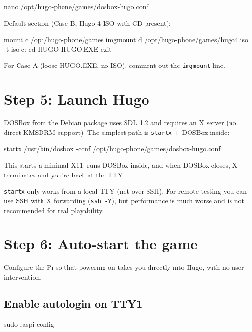 \begin{note}
\begin{shellcode}
nano /opt/hugo-phone/games/dosbox-hugo.conf
\end{shellcode}

Default section (Case B, Hugo 4 ISO with CD present):

\begin{plaincode}
[autoexec]
mount c /opt/hugo-phone/games
imgmount d /opt/hugo-phone/games/hugo4.iso -t iso
c:
cd HUGO
HUGO.EXE
exit
\end{plaincode}

For Case A (loose HUGO.EXE, no ISO), comment out the \texttt{imgmount} line.

\section{Step 5: Launch Hugo}

DOSBox from the Debian package uses SDL 1.2 and requires an X server (no direct KMSDRM support). The simplest path is \texttt{startx} + DOSBox inside:

\begin{shellcode}
startx /usr/bin/dosbox -conf /opt/hugo-phone/games/dosbox-hugo.conf
\end{shellcode}

This starts a minimal X11, runs DOSBox inside, and when DOSBox closes, X terminates and you're back at the TTY.

\begin{note}
\texttt{startx} only works from a local TTY (not over SSH). For remote testing you can use SSH with X forwarding (\texttt{ssh -Y}), but performance is much worse and is not recommended for real playability.
\end{note}

\section{Step 6: Auto-start the game}

Configure the Pi so that powering on takes you directly into Hugo, with no user intervention.

\subsection{Enable autologin on TTY1}

\begin{shellcode}
sudo raspi-config
\end{shellcode}


\end{note}
